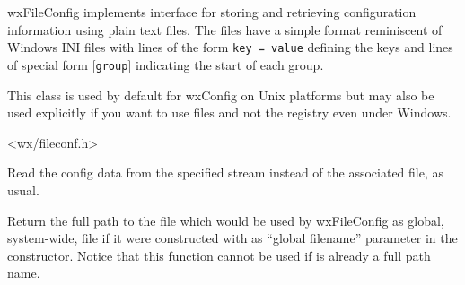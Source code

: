 
\section{}\label{wxfileconfig}

wxFileConfig implements  interface for
storing and retrieving configuration information using plain text files. The
files have a simple format reminiscent of Windows INI files with lines of the
form \texttt{key = value} defining the keys and lines of special form
\texttt{$[$group$]$} indicating the start of each group.

This class is used by default for wxConfig on Unix platforms but may also be
used explicitly if you want to use files and not the registry even under
Windows.




<wx/fileconf.h>



\label{wxfileconfigctor}


Read the config data from the specified stream instead of the associated file,
as usual.




\label{wxfilenamegetglobalfile}


Return the full path to the file which would be used by wxFileConfig as global,
system-wide, file if it were constructed with  as ``global
filename'' parameter in the constructor. Notice that this function cannot be
used if  is already a full path name.



